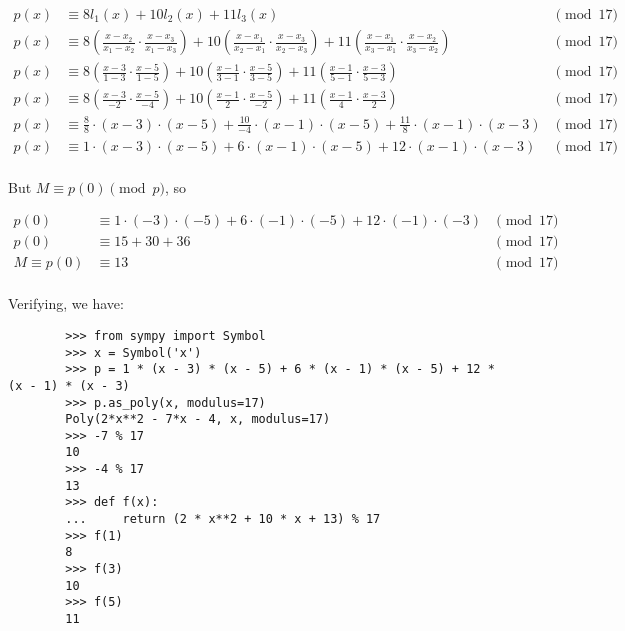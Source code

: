 \documentclass[12pt]{article}
\begin{document}
    \begin{align*}
        p(x) &\equiv 8l_1(x) + 10l_2(x) + 11l_3(x) &\pmod{17}\\
        p(x) &\equiv 8\left(\frac{x - x_2}{x_1 - x_2} \cdot \frac{x - x_3}{x_1 - x_3}\right) + 10\left(\frac{x - x_1}{x_2 - x_1} \cdot \frac{x - x_3}{x_2 - x_3}\right) + 11\left(\frac{x - x_1}{x_3 - x_1} \cdot \frac{x - x_2}{x_3 - x_2}\right) &\pmod{17}\\
        p(x) &\equiv 8\left(\frac{x - 3}{1 - 3} \cdot \frac{x - 5}{1 - 5}\right) + 10\left(\frac{x - 1}{3 - 1} \cdot \frac{x - 5}{3 - 5}\right) + 11\left(\frac{x - 1}{5 - 1} \cdot \frac{x - 3}{5 - 3}\right) &\pmod{17}\\
        p(x) &\equiv 8\left(\frac{x - 3}{-2} \cdot \frac{x - 5}{-4}\right) + 10\left(\frac{x - 1}{2} \cdot \frac{x - 5}{-2}\right) + 11\left(\frac{x - 1}{4} \cdot \frac{x - 3}{2}\right) &\pmod{17}\\
        p(x) &\equiv \frac{8}{8} \cdot (x - 3) \cdot (x - 5) + \frac{10}{-4} \cdot (x - 1) \cdot (x - 5) + \frac{11}{8} \cdot (x - 1) \cdot (x - 3) &\pmod{17}\\
        p(x) &\equiv 1 \cdot (x - 3) \cdot (x - 5) + 6 \cdot (x - 1) \cdot (x - 5) + 12 \cdot (x - 1) \cdot (x - 3) &\pmod{17}\\
    \end{align*}

    But $M \equiv p(0) \pmod{p}$, so

    \begin{align*}
        p(0) &\equiv 1 \cdot (-3) \cdot (-5) + 6 \cdot (-1) \cdot (-5) + 12 \cdot (-1) \cdot (-3) &\pmod{17}\\
        p(0) &\equiv 15 + 30 + 36 &\pmod{17}\\
        M \equiv p(0) &\equiv 13 &\pmod{17}\\
    \end{align*}

    Verifying, we have:

    \begin{verbatim}
        >>> from sympy import Symbol
        >>> x = Symbol('x')
        >>> p = 1 * (x - 3) * (x - 5) + 6 * (x - 1) * (x - 5) + 12 * (x - 1) * (x - 3)
        >>> p.as_poly(x, modulus=17)
        Poly(2*x**2 - 7*x - 4, x, modulus=17)
        >>> -7 % 17
        10
        >>> -4 % 17
        13
        >>> def f(x):
        ...     return (2 * x**2 + 10 * x + 13) % 17
        >>> f(1)
        8
        >>> f(3)
        10
        >>> f(5)
        11
    \end{verbatim}
\end{document}
